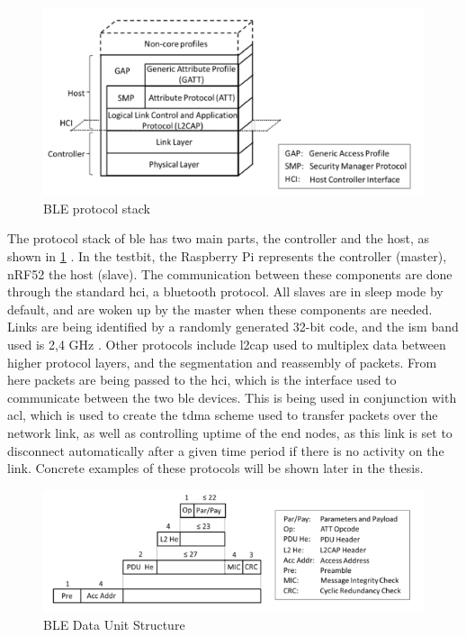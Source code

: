 \begin{figure}[ht]
    \centering
    \includegraphics[scale=0.7]{BLEprotocolStack.png}    
    \caption{BLE protocol stack \cite{gomez2012overview}}
    \label{fig:BLEprotocolStack}
\end{figure}

\noindent The protocol stack of \gls{ble} has two main parts, the controller and the host, as shown in \ref{fig:BLEprotocolStack} \cite{gomez2012overview}. In the testbit, the \gls{Raspberry Pi} represents the controller (master), \gls{nRF52} the host (slave). The communication between these components are done through the standard \gls{hci}, a bluetooth protocol. All slaves are in sleep mode by default, and are woken up by the master when these components are needed. Links are being identified by a randomly generated 32-bit code, and the \gls{ism} band used is 2,4 GHz \cite{gomez2012overview}. Other protocols include \gls{l2cap} used to multiplex data between higher protocol layers, and the segmentation and reassembly of packets. From here packets are being passed to the \gls{hci}, which is the interface used to communicate between the two \gls{ble} devices. This is being used in conjunction with \gls{acl}, which is used to create the \gls{tdma} scheme used to transfer packets over the network link, as well as controlling uptime of the end nodes, as this link is set to disconnect automatically after a given time period if there is no activity on the link. Concrete examples of these protocols will be shown later in the thesis. 



\begin{figure}[ht]
    \centering
    \includegraphics[scale=0.7]{BLEdataUnitStructure.png}    
    \caption{BLE Data Unit Structure \cite{gomez2012overview}}
    \label{fig:BLEdataUnitStructure}
\end{figure}

